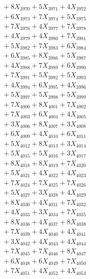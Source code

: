 \documentclass[a4paper,10pt]{article}
\begin{document}
{\begin{align}
&\;  + 8 X_{3970} + 5 X_{3971} + 4 X_{3972} \\[0.3ex]
&\;  + 6 X_{3973} + 7 X_{3974} + 5 X_{3975} \\[0.3ex]
&\;  + 7 X_{3976} + 4 X_{3977} + 7 X_{3978} \\[0.3ex]
&\;  + 4 X_{3979} + 4 X_{3980} + 7 X_{3981} \\[0.3ex]
&\;  + 5 X_{3982} + 7 X_{3983} + 6 X_{3984} \\[0.3ex]
&\;  + 6 X_{3985} + 8 X_{3986} + 5 X_{3987} \\[0.3ex]
&\;  + 4 X_{3988} + 7 X_{3989} + 6 X_{3990} \\[0.3ex]
&\;  + 7 X_{3991} + 5 X_{3992} + 5 X_{3993} \\[0.3ex]
&\;  + 4 X_{3994} + 6 X_{3995} + 4 X_{3996} \\[0.3ex]
&\;  + 5 X_{3997} + 5 X_{3998} + 5 X_{3999} \\[0.5ex]\allowbreak
&\;  + 7 X_{4000} + 8 X_{4001} + 7 X_{4002} \\[0.3ex]
&\;  + 7 X_{4003} + 6 X_{4004} + 4 X_{4005} \\[0.3ex]
&\;  + 3 X_{4006} + 8 X_{4007} + 3 X_{4008} \\[0.3ex]
&\;  + 6 X_{4009} + 4 X_{4010} + 6 X_{4011} \\[0.3ex]
&\;  + 5 X_{4012} + 8 X_{4013} + 3 X_{4014} \\[0.3ex]
&\;  + 5 X_{4015} + 5 X_{4016} + 3 X_{4017} \\[0.3ex]
&\;  + 8 X_{4018} + 8 X_{4019} + 7 X_{4020} \\[0.3ex]
&\;  + 5 X_{4021} + 4 X_{4022} + 4 X_{4023} \\[0.3ex]
&\;  + 7 X_{4024} + 7 X_{4025} + 7 X_{4026} \\[0.3ex]
&\;  + 5 X_{4027} + 3 X_{4028} + 4 X_{4029} \\[0.5ex]\allowbreak
&\;  + 8 X_{4030} + 4 X_{4031} + 7 X_{4032} \\[0.3ex]
&\;  + 4 X_{4033} + 3 X_{4034} + 7 X_{4035} \\[0.3ex]
&\;  + 8 X_{4036} + 4 X_{4037} + 8 X_{4038} \\[0.3ex]
&\;  + 7 X_{4039} + 4 X_{4040} + 4 X_{4041} \\[0.3ex]
&\;  + 3 X_{4042} + 4 X_{4043} + 4 X_{4044} \\[0.3ex]
&\;  + 7 X_{4045} + 7 X_{4046} + 8 X_{4047} \\[0.3ex]
&\;  + 6 X_{4048} + 6 X_{4049} + 7 X_{4050} \\[0.3ex]
&\;  + 7 X_{4051} + 4 X_{4052} + 4 X_{4053} \\[0.3ex]

\end{align}}
\end{document}
